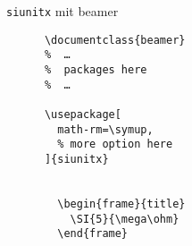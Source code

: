 \begin{frame}[fragile]{\lstinline+siunitx+ mit beamer}
  \begin{center}
    \begin{lstlisting}
      \documentclass{beamer}
      %  …
      %  packages here
      %  …

      \usepackage[
        math-rm=\symup,
        % more option here
      ]{siunitx}

      
        \begin{frame}{title}
          \SI{5}{\mega\ohm}
        \end{frame}
      
    \end{lstlisting}
  \end{center}
\end{frame}
